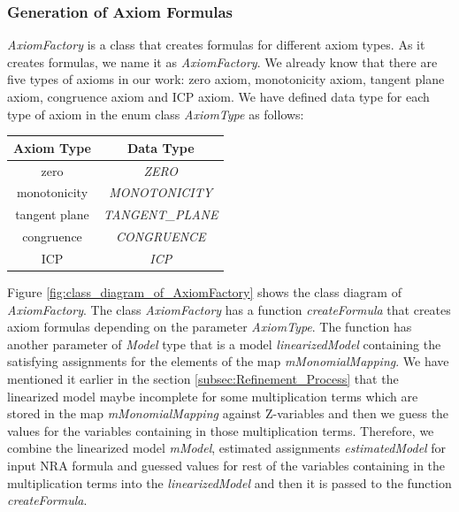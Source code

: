 \subsubsection{Generation of Axiom Formulas}
\label{subsubsec:Generation_of_Axiom_Formulas}
\textit{AxiomFactory} is a class that creates formulas for different axiom types.
As it creates formulas, we name it as \textit{AxiomFactory}.
We already know that there are five types of axioms in our work: zero axiom, monotonicity axiom, tangent plane axiom, congruence axiom and ICP axiom.
We have defined data type for each type of axiom in the enum class \textit{AxiomType} as follows:
\begin{table}[!ht]
\label{table:axiomType}
\centering
\begin{tabular}{|c|c|}
\hline
Axiom Type    & Data Type                                \\ \hline
zero          & \textit{ZERO}           \\ \hline
monotonicity  & \textit{MONOTONICITY}   \\ \hline
tangent plane & \textit{TANGENT\_PLANE} \\ \hline
congruence    & \textit{CONGRUENCE}     \\ \hline
ICP           & \textit{ICP}            \\ \hline
\end{tabular}
\end{table}

\noindent Figure \ref{fig:class_diagram_of_AxiomFactory} shows the class diagram of \textit{AxiomFactory}.
The class \textit{AxiomFactory} has a function \textit{createFormula} that creates axiom formulas depending on the parameter \textit{AxiomType}.
The function has another parameter of \textit{Model} type that is a model \textit{linearizedModel} containing the satisfying assignments for the elements of the map \textit{mMonomialMapping}.
We have mentioned it earlier in the section \ref{subsec:Refinement_Process} that the linearized model maybe incomplete for some multiplication terms which are stored in the map \textit{mMonomialMapping} against Z-variables and then we guess the values for the variables containing in those multiplication terms.
Therefore, we combine the linearized model \textit{mModel}, estimated assignments \textit{estimatedModel} for input NRA formula and guessed values for rest of the variables containing in the multiplication terms into the \textit{linearizedModel} and then it is passed to the function \textit{createFormula}.\newline

